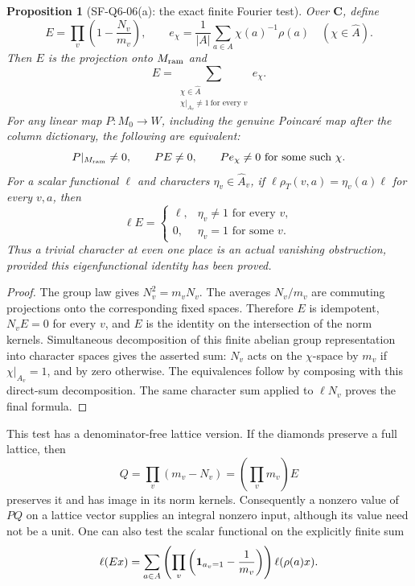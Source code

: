 \documentclass[11pt,a4paper]{article}
\newtheorem{proposition}[theorem]{Proposition}
\theoremstyle{definition}
\theoremstyle{remark}
\begin{document}
\begin{proposition}[SF-Q6-06(a): the exact finite Fourier test]
\label{prop:diamond-fourier-test}
Over $\mathbf C$, define
\[
 E=\prod_v\left(1-\frac{N_v}{m_v}\right),\qquad
 e_\chi=\frac1{|A|}\sum_{a\in A}\chi(a)^{-1}\rho(a)
 \quad(\chi\in\widehat A).
\]
Then $E$ is the projection onto $M_{\rm ram}$ and
\[
 E=\sum_{\substack{\chi\in\widehat A\\
                  \chi|_{A_v}\ne1\ \text{for every }v}}e_\chi.
\]
For any linear map $P:M_0\to W$, including the genuine
Poincar\'e map after the column dictionary, the following are
equivalent:
\[
 P|_{M_{\rm ram}}\ne0,
 \qquad PE\ne0,
 \qquad Pe_\chi\ne0\text{ for some such }\chi.
\]
For a scalar functional $\ell$ and characters $\eta_v\in\widehat A_v$, if
$\ell\rho_T(v,a)=\eta_v(a)\ell$ for every $v,a$, then
\[
 \ell E=
 \begin{cases}
 \ell,&\eta_v\ne1\text{ for every }v,\\
 0,&\eta_v=1\text{ for some }v.
 \end{cases}
\]
Thus a trivial character at even one place is an actual vanishing
obstruction, provided this eigenfunctional identity has been proved.
\end{proposition}
\begin{proof}
The group law gives $N_v^2=m_vN_v$.  The averages $N_v/m_v$ are
commuting projections onto the corresponding fixed spaces.  Therefore
$E$ is idempotent, $N_vE=0$ for every $v$, and $E$ is the identity
on the intersection of the norm kernels.  Simultaneous decomposition
of this finite abelian group representation into character spaces
gives the asserted sum: $N_v$ acts on the $\chi$-space by $m_v$
if $\chi|_{A_v}=1$, and by zero otherwise.  The equivalences follow
by composing with this direct-sum decomposition.  The same character
sum applied to $\ell N_v$ proves the final formula.
\end{proof}

This test has a denominator-free lattice version.  If the diamonds
preserve a full lattice, then
\[
 Q=\prod_v(m_v-N_v)=\left(\prod_v m_v\right)E
\]
preserves it and has image in its norm kernels.  Consequently a
nonzero value of $PQ$ on a lattice vector supplies an integral
nonzero input, although its value need not be a unit.  One can also
test the scalar functional on the explicitly finite sum
\begin{equation}
 \ell(E x)=\sum_{a\in A}
 \left(\prod_v\left({\bf1}_{a_v=1}-\frac1{m_v}\right)\right)
 \ell(\rho(a)x).
 \label{eq:diamond-finite-test}
\end{equation}
\end{document}
